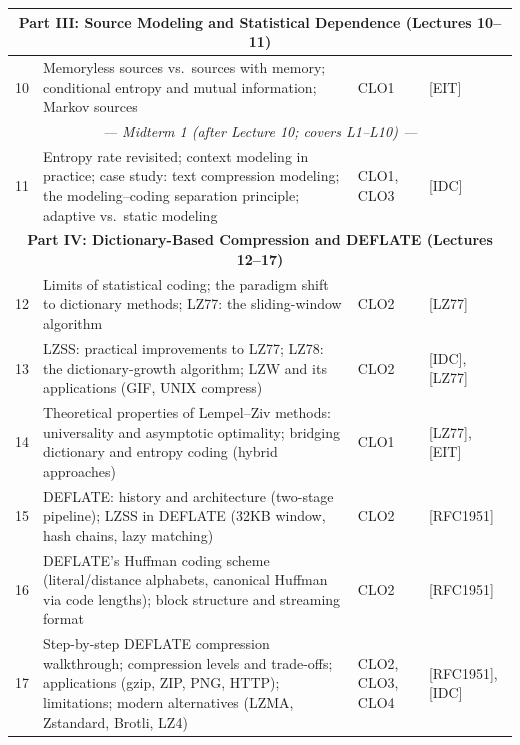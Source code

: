 \documentclass{article}
\begin{document}
\begin{longtable}{|c|p{8.7cm}|p{1.6cm}|p{2.6cm}|}
\multicolumn{4}{|c|}{\cellcolor{gray!20}\textbf{Part III: Source Modeling and Statistical Dependence (Lectures 10--11)}} \\ \hline
10 & Memoryless sources vs.\ sources with memory; conditional entropy and mutual information; Markov sources & CLO1 & [EIT] \\ \hline
\multicolumn{4}{|c|}{\cellcolor{yellow!25}\textit{--- Midterm 1 (after Lecture 10; covers L1--L10) ---}} \\ \hline
11 & Entropy rate revisited; context modeling in practice; case study: text compression modeling; the modeling--coding separation principle; adaptive vs.\ static modeling & CLO1, CLO3 & [IDC] \\ \hline

\multicolumn{4}{|c|}{\cellcolor{gray!20}\textbf{Part IV: Dictionary-Based Compression and DEFLATE (Lectures 12--17)}} \\ \hline
12 & Limits of statistical coding; the paradigm shift to dictionary methods; LZ77: the sliding-window algorithm & CLO2 & [LZ77] \\ \hline
13 & LZSS: practical improvements to LZ77; LZ78: the dictionary-growth algorithm; LZW and its applications (GIF, UNIX compress) & CLO2 & [IDC], [LZ77] \\ \hline
14 & Theoretical properties of Lempel--Ziv methods: universality and asymptotic optimality; bridging dictionary and entropy coding (hybrid approaches) & CLO1 & [LZ77], [EIT] \\ \hline
15 & DEFLATE: history and architecture (two-stage pipeline); LZSS in DEFLATE (32KB window, hash chains, lazy matching) & CLO2 & [RFC1951] \\ \hline
16 & DEFLATE's Huffman coding scheme (literal/distance alphabets, canonical Huffman via code lengths); block structure and streaming format & CLO2 & [RFC1951] \\ \hline
17 & Step-by-step DEFLATE compression walkthrough; compression levels and trade-offs; applications (gzip, ZIP, PNG, HTTP); limitations; modern alternatives (LZMA, Zstandard, Brotli, LZ4) & CLO2, CLO3, CLO4 & [RFC1951], [IDC] \\ \hline


\end{longtable}
\end{document}

